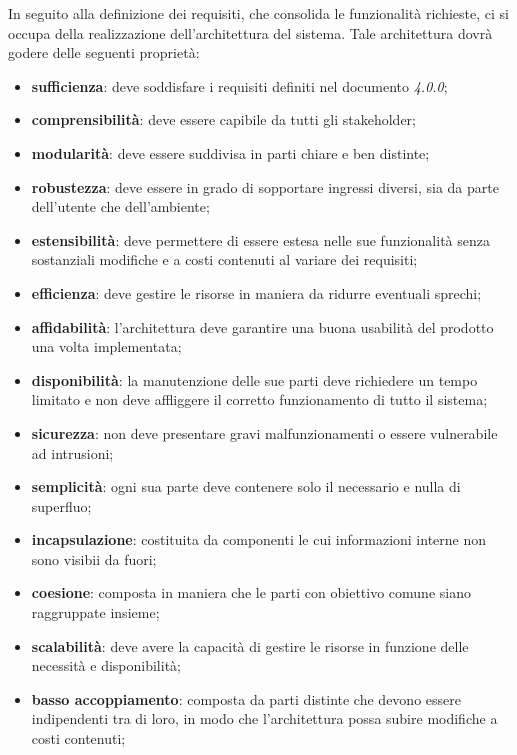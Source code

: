     	In seguito alla definizione dei requisiti, che consolida le funzionalità richieste, ci si occupa della realizzazione dell'architettura del sistema. Tale architettura dovrà godere delle seguenti proprietà:
    	\begin{itemize}
    		\item{\textbf{sufficienza}}: deve soddisfare i requisiti definiti nel documento \AdR{} \textit{4.0.0};
    		\item{\textbf{comprensibilità}}: deve essere capibile da tutti gli stakeholder;
    		\item{\textbf{modularità}}: deve essere suddivisa in parti chiare e ben distinte;
    		\item{\textbf{robustezza}}: deve essere in grado di sopportare ingressi diversi, sia da parte dell'utente che dell'ambiente;
    		\item{\textbf{estensibilità}}: deve permettere di essere estesa nelle sue funzionalità senza sostanziali modifiche e a costi contenuti al variare dei requisiti;
    		\item{\textbf{efficienza}}: deve gestire le risorse in maniera da ridurre eventuali sprechi;
    		\item{\textbf{affidabilità}}: l'architettura deve garantire una buona usabilità del prodotto una volta implementata;
    		\item{\textbf{disponibilità}}: la manutenzione delle sue parti deve richiedere un tempo limitato e non deve affliggere il corretto funzionamento di tutto il sistema;
    		\item{\textbf{sicurezza}}: non deve presentare gravi malfunzionamenti o essere vulnerabile ad intrusioni;
    		\item{\textbf{semplicità}}: ogni sua parte deve contenere solo il necessario e nulla di superfluo;
    		\item{\textbf{incapsulazione}}: costituita da componenti le cui informazioni interne non sono visibii da fuori;
    		\item{\textbf{coesione}}: composta in maniera che le parti con obiettivo comune siano raggruppate insieme;
    		\item{\textbf{scalabilità}}: deve avere la capacità di gestire le risorse in funzione delle necessità e disponibilità;
    		\item{\textbf{basso accoppiamento}}: composta da parti distinte che devono essere indipendenti tra di loro, in modo che l'architettura possa subire modifiche a costi contenuti;
    	\end{itemize}

